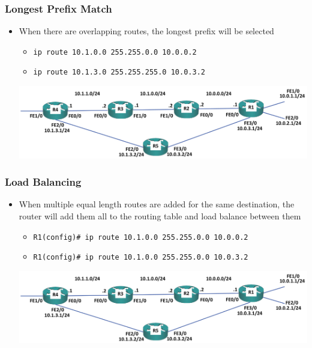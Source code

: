 \documentclass[pdflatex,compress,mathserif]{beamer}
\begin{document}
\begin{frame}
	\frametitle{Longest Prefix Match}
	\begin{itemize}
		\item When there are overlapping routes, the longest prefix will be selected
		\begin{itemize}
			\item[] \texttt{ip route 10.1.0.0 255.255.0.0 10.0.0.2}
			\item[] \texttt{ip route 10.1.3.0 255.255.255.0 10.0.3.2}
		\end{itemize}
		\begin{center}
			\includegraphics[width=\linewidth]{img/img09}
		\end{center}
	\end{itemize}
\end{frame}

\begin{frame}
	\frametitle{Load Balancing}
	\begin{itemize}
		\item When multiple equal length routes are added for the same destination, the router will add them all to the routing table and load balance between them
		\begin{itemize}
			\item[] \texttt{R1(config)\# ip route 10.1.0.0 255.255.0.0 10.0.0.2}
			\item[] \texttt{R1(config)\# ip route 10.1.0.0 255.255.0.0 10.0.3.2}
		\end{itemize}
		\begin{center}
			\includegraphics[width=\linewidth]{img/img09}
		\end{center}
	\end{itemize}
\end{frame}
\end{document}
